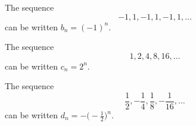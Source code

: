 \begin{frame}
\begin{example}
The sequence 
\[
-1, 1, -1, 1, -1, 1, \ldots
\]
can be written $b_n = (-1)^n$.  
\end{example}

\begin{example}
The sequence 
\[
1,2,4,8,16,\ldots
\]
can be written $c_n = 2^n$.  
\end{example}

\begin{example}
The sequence 
\[
\frac{1}{2}, -\frac{1}{4},\frac{1}{8},-\frac{1}{16},\ldots
\]
can be written $d_n = -\big( -\frac{1}{2}\big)^n$.  
\end{example}

\end{frame}
